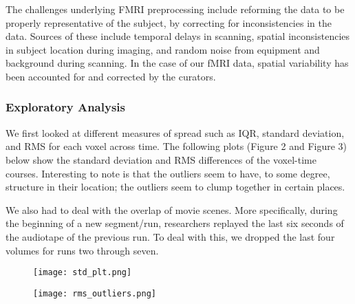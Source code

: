 \par The challenges underlying FMRI preprocessing include reforming the data to be properly representative of the subject, by correcting for inconsistencies in the data. \cite{lindquist2008statistical} Sources of these include temporal delays in scanning, spatial inconsistencies in subject location during imaging, and random noise from equipment and background during scanning. In the case of our fMRI data, spatial variability has been accounted for and corrected by the curators.

\subsubsection{Exploratory Analysis}
\par We first looked at different measures of spread such as IQR, standard deviation, and RMS for each voxel across time. The following plots (Figure 2 and Figure 3) below show the standard deviation and RMS differences of the voxel-time courses. Interesting to note is that the outliers seem to have, to some degree, structure in their location; the outliers seem to clump together in certain places. 
\par We also had to deal with the overlap of movie scenes. More specifically, during the beginning of a new segment/run, researchers replayed the last six seconds of the audiotape of the previous run. To deal with this, we dropped the last four volumes for runs two through seven. 

\begin{figure}[H]
\centering
\begin{minipage}{.5\textwidth}
  \centering
  \texttt{[image: std\_plt.png]}
  \label{fig:test3}
\end{minipage}%
\begin{minipage}{.5\textwidth}
  \centering
  \texttt{[image: rms\_outliers.png]}
  \label{fig:test4}
\end{minipage}
\end{figure}


